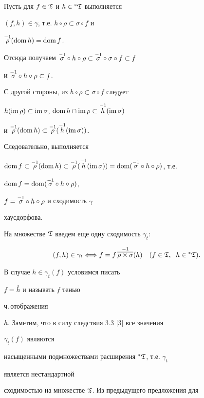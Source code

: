 \begin{pf}


Пусть для $f\in\frak T$ и $h\in{}^*\frak T$ выполняется


$(f,h)\in\gamma$, т.е. $h\circ \rho\subset\sigma\circ f$ и


$\overset{-1}{\rho}{} (\operatorname{dom} h)=\operatorname{dom} f$.


Отсюда получаем $\mis \circ h\circ \rho\subset\mis\circ


\sigma\circ f\subset f$


и $\overset{-1}{\sigma}{}\circ h\circ \rho\subset f$.


С другой стороны, из $h\circ \rho\subset\sigma\circ f$ следует


$h(\operatorname{im}\rho)\subset\operatorname{im}\sigma$, $\operatorname{dom} h\cap\operatorname{im}\rho\subset\overset{-1}{h}{}(\operatorname{im}\sigma)$


и $\overset{-1}{\rho}{} (\operatorname{dom} h)\subset\overset{-1}{\rho}{}(\overset{-1}{h}{} (\operatorname{im}\sigma))$.


Следовательно, выполняется


$\dom f\subset\mir (\dom h)\subset\mir (\mih


(\imm\sigma))=\dom(\mis\circ h\circ \rho)$, т.е.


$\operatorname{dom} f=\operatorname{dom}(\overset{-1}{\sigma}{}\circ h\circ \rho)$,


$f=\overset{-1}{\sigma}{}\circ h\circ \rho$ и сходимость $\gamma$


хаусдорфова.


\end{pf}





На множестве $\frak T$ введем еще одну сходимость $\gamma_t$:


$$


(f,h)\in\gamma_t\Longleftrightarrow f=f\,


\overset{-1}{\overline{\rho\times\sigma}}{}(h)\quad


(f\in\frak T, \ \; h\in{}^*\frak T).


$$


В случае $h\in\gamma_t(f)$ условимся писать


$f=\overset{\circ}{h}$ и называть $f$ тенью


ч.\,отображения


$h$. Заметим, что в силу следствия 3.3 [3] все значения


$\gamma_t(f)$ являются


насыщенными подмножествами расширения ${}^*\frak T$, т.е. $\gamma_t$


является нестандартной


сходимостью на множестве $\frak T$. Из предыдущего предложения для


